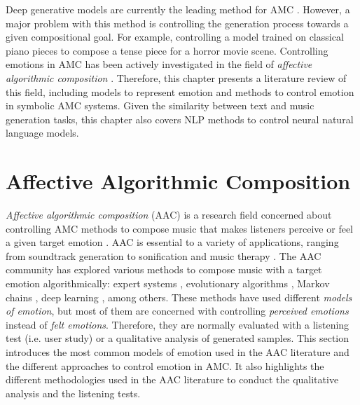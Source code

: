 Deep generative models are currently the leading method for AMC \cite{yang2019deep}. However, a major problem with this method is controlling the generation process towards a given compositional goal. For example, controlling a model trained on classical piano pieces to compose a tense piece for a horror movie scene. Controlling emotions in AMC has been actively investigated in the field of \textit{affective algorithmic composition} \cite{williams2015investigating}. Therefore, this chapter presents a literature review of this field, including models to represent emotion and methods to control emotion in symbolic AMC systems. Given the similarity between text and music generation tasks, this chapter also covers NLP methods to control neural natural language models.

\section{Affective Algorithmic Composition}

\textit{Affective algorithmic composition} (AAC) is a research field concerned about controlling AMC methods to compose music that makes listeners perceive or feel a given target emotion \cite{williams2015investigating}. AAC is essential to a variety of applications, ranging from soundtrack generation \cite{williams2015dynamic} to sonification \cite{Chen2015} and music therapy \cite{miranda2011brain}. The AAC community has explored various methods to compose music with a target emotion algorithmically: expert systems \cite{williams2015dynamic}, evolutionary algorithms \cite{kim2004composing}, Markov chains \cite{monteith2010automatic}, deep learning \cite{madhok2018sentimozart}, among others. These methods have used different \textit{models of emotion}, but most of them are concerned with controlling \textit{perceived emotions} instead of \textit{felt emotions}. Therefore, they are normally evaluated with a listening test (i.e. user study) or a qualitative analysis of generated samples. This section introduces the most common models of emotion used in the AAC literature and the different approaches to control emotion in AMC. It also highlights the different methodologies used in the AAC literature to conduct the qualitative analysis and the listening tests.


